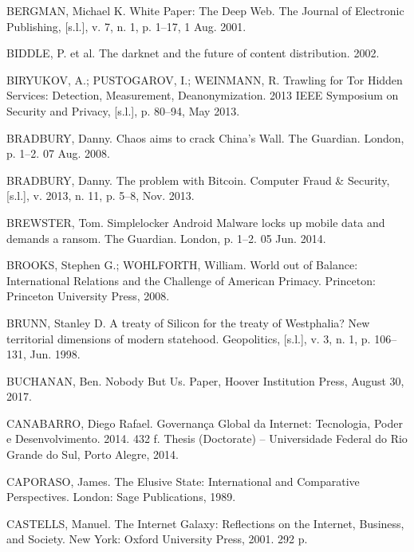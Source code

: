 \begin{list}{}{\setlength{\leftmargin}{0pt}\setlength{\itemsep}{6pt}\setlength{\parsep}{0pt}}
\item BERGMAN, Michael K. White Paper: The Deep Web. The Journal of Electronic Publishing, [s.l.], v. 7, n. 1, p. 1--17, 1 Aug. 2001.

\item BIDDLE, P. et al. The darknet and the future of content distribution. 2002.

\item BIRYUKOV, A.; PUSTOGAROV, I.; WEINMANN, R. Trawling for Tor Hidden Services: Detection, Measurement, Deanonymization. 2013 IEEE Symposium on Security and Privacy, [s.l.], p. 80--94, May 2013.

\item BRADBURY, Danny. Chaos aims to crack China's Wall. The Guardian. London, p. 1--2. 07 Aug. 2008.

\item BRADBURY, Danny. The problem with Bitcoin. Computer Fraud \& Security, [s.l.], v. 2013, n. 11, p. 5--8, Nov. 2013.

\item BREWSTER, Tom. Simplelocker Android Malware locks up mobile data and demands a ransom. The Guardian. London, p. 1--2. 05 Jun. 2014.

\item BROOKS, Stephen G.; WOHLFORTH, William. World out of Balance: International Relations and the Challenge of American Primacy. Princeton: Princeton University Press, 2008.

\item BRUNN, Stanley D. A treaty of Silicon for the treaty of Westphalia? New territorial dimensions of modern statehood. Geopolitics, [s.l.], v. 3, n. 1, p. 106--131, Jun. 1998.

\item BUCHANAN, Ben. Nobody But Us. Paper, Hoover Institution Press, August 30, 2017.

\item CANABARRO, Diego Rafael. Governan\c{c}a Global da Internet: Tecnologia, Poder e Desenvolvimento. 2014. 432 f. Thesis (Doctorate) -- Universidade Federal do Rio Grande do Sul, Porto Alegre, 2014.

\item CAPORASO, James. The Elusive State: International and Comparative Perspectives. London: Sage Publications, 1989.

\item CASTELLS, Manuel. The Internet Galaxy: Reflections on the Internet, Business, and Society. New York: Oxford University Press, 2001. 292 p.


\end{list}

